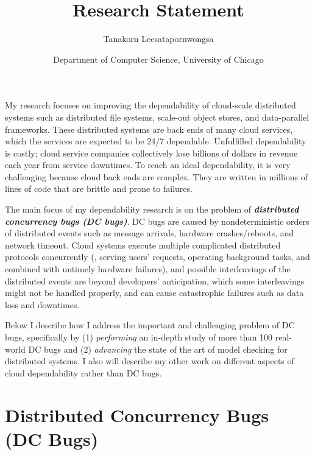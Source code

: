 \documentclass[10pt]{article}
\begin{document}
\title{Research Statement}
\author{Tanakorn Leesatapornwongsa}
\date{\vspace{-1ex} \small{Department of Computer Science, University of
Chicago}}

\maketitle

My research focuses on improving the dependability of cloud-scale distributed
systems such as distributed file systems, scale-out object stores, and
data-parallel frameworks. These distributed systems are back ends of many cloud
services, which the services are expected to be 24/7 dependable. Unfulfilled
dependability is costly; cloud service companies collectively lose billions of
dollars in revenue each year from service downtimes. To reach an ideal
dependability, it is very challenging because cloud back ends are complex. They
are written in millions of lines of code that are brittle and prone to failures.

The main focus of my dependability research is on the problem of
\textbf{\textit{distributed concurrency bugs (DC bugs)}}. DC bugs are caused by
nondeterministic orders of distributed events such as message arrivals,
hardware crashes/reboots, and network timeout. Cloud systems execute
multiple complicated distributed protocols concurrently (\eg, serving users'
requests, operating background tasks, and combined with untimely hardware
failures), and possible interleavings of the distributed events are beyond
developers' anticipation, which some interleavings might not be handled
properly, and can cause catastrophic failures such as data loss and downtimes.

Below I describe how I address the important and challenging problem of DC
bugs, specifically by (1) \textit{performing} an in-depth study of more than
100 real-world DC bugs and (2) \textit{advancing} the state of the art of model
checking for distributed systems. I also will describe my other work on
different aspects of cloud dependability rather than DC bugs.

\section{Distributed Concurrency Bugs (DC Bugs)}\label{dcbugs}

\end{document}
